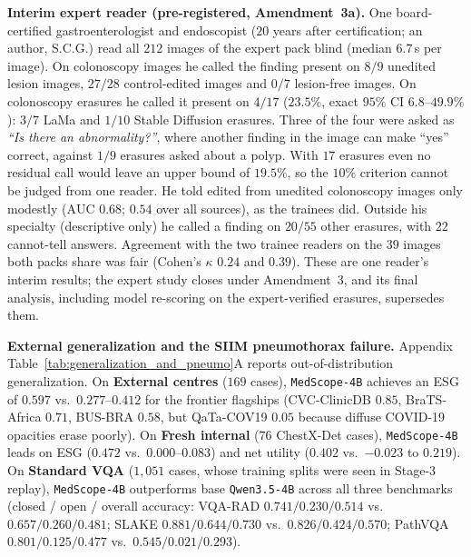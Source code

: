 \documentclass[5p,times,twocolumn,authoryear]{elsarticle}
\begin{document}
\textbf{Interim expert reader (pre-registered, Amendment~3a).} One board-certified gastroenterologist and endoscopist ($20$ years after certification; an author, S.C.G.) read all $212$ images of the expert pack blind (median $6.7$\,s per image). On colonoscopy images he called the finding present on $8/9$ unedited lesion images, $27/28$ control-edited images and $0/7$ lesion-free images. On colonoscopy erasures he called it present on $4/17$ ($23.5\%$, exact $95\%$ CI $6.8\text{--}49.9\%$): $3/7$ LaMa and $1/10$ Stable Diffusion erasures. Three of the four were asked as \emph{``Is there an abnormality?''}, where another finding in the image can make ``yes'' correct, against $1/9$ erasures asked about a polyp. With $17$ erasures even no residual call would leave an upper bound of $19.5\%$, so the $10\%$ criterion cannot be judged from one reader. He told edited from unedited colonoscopy images only modestly ($\text{AUC } 0.68$; $0.54$ over all sources), as the trainees did. Outside his specialty (descriptive only) he called a finding on $20/55$ other erasures, with $22$ cannot-tell answers. Agreement with the two trainee readers on the $39$ images both packs share was fair (Cohen's $\kappa$ $0.24$ and $0.39$). These are one reader's interim results; the expert study closes under Amendment~3, and its final analysis, including model re-scoring on the expert-verified erasures, supersedes them.

\textbf{External generalization and the SIIM pneumothorax failure.} Appendix Table~\ref{tab:generalization_and_pneumo}A reports out-of-distribution generalization. On \textbf{External centres} ($169$ cases), \texttt{MedScope-4B} achieves an ESG of $0.597$ vs.\ $0.277\text{--}0.412$ for the frontier flagships (CVC-ClinicDB $0.85$, BraTS-Africa $0.71$, BUS-BRA $0.58$, but QaTa-COV19 $0.05$ because diffuse COVID-19 opacities erase poorly). On \textbf{Fresh internal} ($76$ ChestX-Det cases), \texttt{MedScope-4B} leads on ESG ($0.472$ vs.\ $0.000\text{--}0.083$) and net utility ($0.402$ vs.\ $-0.023$ to $0.219$). On \textbf{Standard VQA} ($1,051$ cases, whose training splits were seen in Stage-3 replay), \texttt{MedScope-4B} outperforms base \texttt{Qwen3.5-4B} across all three benchmarks (closed / open / overall accuracy: VQA-RAD $0.741 / 0.230 / 0.514$ vs.\ $0.657 / 0.260 / 0.481$; SLAKE $0.881 / 0.644 / 0.730$ vs.\ $0.826 / 0.424 / 0.570$; PathVQA $0.801 / 0.125 / 0.477$ vs.\ $0.545 / 0.021 / 0.293$).
\end{document}
